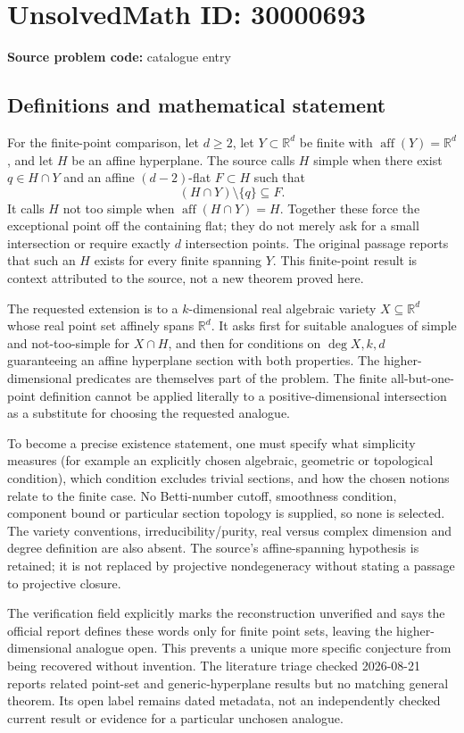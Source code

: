 \documentclass[11pt]{article}
\newcommand{\R}{\mathbb{R}}
\begin{document}
\section*{UnsolvedMath ID: 30000693}
\textbf{Source problem code:} catalogue entry
\subsection{Definitions and mathematical statement}
For the finite-point comparison, let \(d\geq2\), let \(Y\subset\R^d\) be finite with \(\operatorname{aff}(Y)=\R^d\), and let \(H\) be an affine hyperplane. The source calls \(H\) simple when there exist \(q\in H\cap Y\) and an affine \((d-2)\)-flat \(F\subset H\) such that
\[
 (H\cap Y)\setminus\{q\}\subseteq F.
\]
It calls \(H\) not too simple when \(\operatorname{aff}(H\cap Y)=H\). Together these force the exceptional point off the containing flat; they do not merely ask for a small intersection or require exactly \(d\) intersection points. The original passage reports that such an \(H\) exists for every finite spanning \(Y\). This finite-point result is context attributed to the source, not a new theorem proved here.

The requested extension is to a \(k\)-dimensional real algebraic variety \(X\subseteq\R^d\) whose real point set affinely spans \(\R^d\). It asks first for suitable analogues of simple and not-too-simple for \(X\cap H\), and then for conditions on \(\deg X,k,d\) guaranteeing an affine hyperplane section with both properties. The higher-dimensional predicates are themselves part of the problem. The finite all-but-one-point definition cannot be applied literally to a positive-dimensional intersection as a substitute for choosing the requested analogue.

To become a precise existence statement, one must specify what simplicity measures (for example an explicitly chosen algebraic, geometric or topological condition), which condition excludes trivial sections, and how the chosen notions relate to the finite case. No Betti-number cutoff, smoothness condition, component bound or particular section topology is supplied, so none is selected. The variety conventions, irreducibility/purity, real versus complex dimension and degree definition are also absent. The source's affine-spanning hypothesis is retained; it is not replaced by projective nondegeneracy without stating a passage to projective closure.

The verification field explicitly marks the reconstruction unverified and says the official report defines these words only for finite point sets, leaving the higher-dimensional analogue open. This prevents a unique more specific conjecture from being recovered without invention. The literature triage checked 2026-08-21 reports related point-set and generic-hyperplane results but no matching general theorem. Its open label remains dated metadata, not an independently checked current result or evidence for a particular unchosen analogue.
\end{document}
